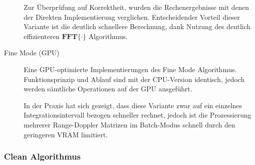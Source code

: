 \begin{description}
          Zur Überprüfung auf Korrektheit, wurden die Rechenergebnisse mit denen der Direkten Implementierung verglichen. Entscheidender Vorteil dieser Variante ist die deutlich schnellere Berechnung, dank Nutzung des deutlich effizienteren \(\mathbf{FFT} {\{ \cdot \}}\) Algorithmus.

    \item[Fine Mode (GPU)]

          Eine GPU-optimierte Implementierungen des Fine Mode Algorithmus. Funktionsprinzip und Ablauf sind mit der CPU-Version identisch, jedoch werden sämtliche Operationen auf der GPU ausgeführt.

          In der Praxis hat sich gezeigt, dass diese Variante zwar auf ein einzelnes Integrationsintervall bezogen schneller rechnet, jedoch ist die Prozessierung mehrerer Range-Doppler Matrizen im Batch-Modus schnell durch den geringeren VRAM limitiert.
\end{description}

\subsubsection{Clean Algorithmus}
